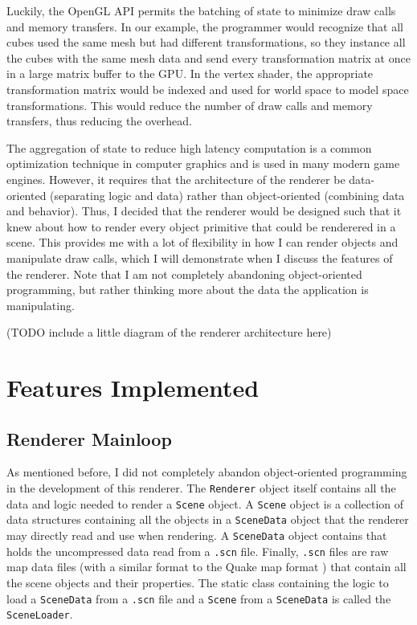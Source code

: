 \documentclass[letterpaper, 10 pt, conference]{ieeeconf}  %
\begin{document}
Luckily, the OpenGL API permits the batching of state to minimize draw calls and memory transfers. In our example, the programmer would recognize that all cubes used the same mesh but had different transformations, so they instance all the cubes with the same mesh data and send every transformation matrix at once in a large matrix buffer to the GPU. In the vertex shader, the appropriate transformation matrix would be indexed and used for world space to model space transformations. This would reduce the number of draw calls and memory transfers, thus reducing the overhead.

The aggregation of state to reduce high latency computation is a common optimization technique in computer graphics and is used in many modern game engines. However, it requires that the architecture of the renderer be data-oriented (separating logic and data) rather than object-oriented (combining data and behavior). Thus, I decided that the renderer would be designed such that it knew about how to render every object primitive that could be renderered in a scene. This provides me with a lot of flexibility in how I can render objects and manipulate draw calls, which I will demonstrate when I discuss the features of the renderer. Note that I am not completely abandoning object-oriented programming, but rather thinking more about the data the application is manipulating. 

(TODO include a little diagram of the renderer architecture here)



\section{Features Implemented}

\subsection {Renderer Mainloop}
As mentioned before, I did not completely abandon object-oriented programming in the development of this renderer. The \texttt{Renderer} object itself contains all the data and logic needed to render a \texttt{Scene} object. A \texttt{Scene} object is a collection of data structures containing all the objects in a \texttt{SceneData} object that the renderer may directly read and use when rendering. A \texttt{SceneData} object contains that holds the uncompressed data read from a \texttt{.scn} file. Finally, \texttt{.scn} files are raw map data files (with a similar format to the Quake map format \cite{quake}) that contain all the scene objects and their properties. The static class containing the logic to load a \texttt{SceneData} from a \texttt{.scn} file and a \texttt{Scene} from a \texttt{SceneData} is called the \texttt{SceneLoader}.
\end{document}
